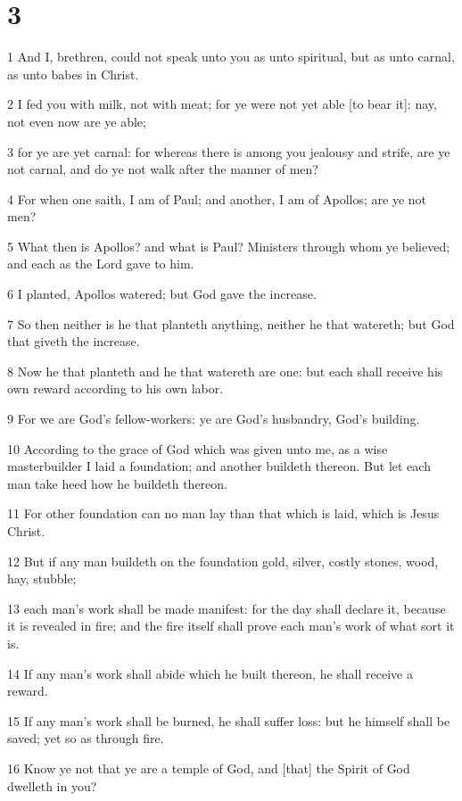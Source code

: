 \chapter{3}

\par 1 And I, brethren, could not speak unto you as unto spiritual, but as unto carnal, as unto babes in Christ.
\par 2 I fed you with milk, not with meat; for ye were not yet able [to bear it]: nay, not even now are ye able;
\par 3 for ye are yet carnal: for whereas there is among you jealousy and strife, are ye not carnal, and do ye not walk after the manner of men?
\par 4 For when one saith, I am of Paul; and another, I am of Apollos; are ye not men?
\par 5 What then is Apollos? and what is Paul? Ministers through whom ye believed; and each as the Lord gave to him.
\par 6 I planted, Apollos watered; but God gave the increase.
\par 7 So then neither is he that planteth anything, neither he that watereth; but God that giveth the increase.
\par 8 Now he that planteth and he that watereth are one: but each shall receive his own reward according to his own labor.
\par 9 For we are God's fellow-workers: ye are God's husbandry, God's building.
\par 10 According to the grace of God which was given unto me, as a wise masterbuilder I laid a foundation; and another buildeth thereon. But let each man take heed how he buildeth thereon.
\par 11 For other foundation can no man lay than that which is laid, which is Jesus Christ.
\par 12 But if any man buildeth on the foundation gold, silver, costly stones, wood, hay, stubble;
\par 13 each man's work shall be made manifest: for the day shall declare it, because it is revealed in fire; and the fire itself shall prove each man's work of what sort it is.
\par 14 If any man's work shall abide which he built thereon, he shall receive a reward.
\par 15 If any man's work shall be burned, he shall suffer loss: but he himself shall be saved; yet so as through fire.
\par 16 Know ye not that ye are a temple of God, and [that] the Spirit of God dwelleth in you?
